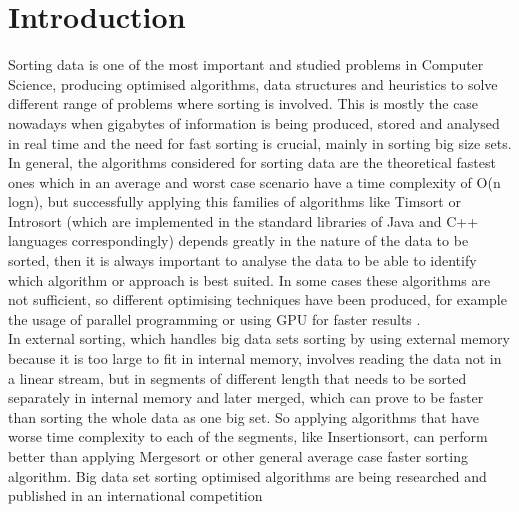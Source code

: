 \documentclass[a4paper,12pt]{article}
\begin{document}
\newpage
\tableofcontents
\newpage

\section{Introduction}

Sorting data is one of the most important and studied problems in Computer Science, producing optimised algorithms, data structures and heuristics to solve different range of problems where sorting is involved. This is mostly the case nowadays when gigabytes of information is being produced, stored and analysed in real time and the need for fast sorting is crucial, mainly in sorting big size sets. In general, the algorithms considered for sorting data are the theoretical fastest ones which in an average and worst case scenario have a time complexity of O(n logn), but successfully applying this families of algorithms like Timsort\cite{Timsort} or Introsort\cite{musser1997introspective} (which are implemented in the standard libraries of Java and C++ languages correspondingly) depends greatly in the nature of the data to be sorted, then it is always important to analyse the data to be able to identify which algorithm or approach is best suited. In some cases these algorithms are not sufficient, so different optimising techniques have been produced, for example the usage of parallel programming or using GPU for faster results \cite{satish2009designing}. \\ 

In external sorting, which handles big data sets sorting by using external memory because it is too large to fit in internal memory, involves reading the data not in a linear stream, but in segments of different length that needs to be sorted separately in internal memory and later merged, which can prove to be faster than sorting the whole data as one big set. So applying algorithms that have worse time complexity to each of the segments, like Insertionsort, can perform better than applying Mergesort or other general average case faster sorting algorithm. Big data set sorting optimised algorithms are being researched and published in an international competition \cite{SortBenchmark} \\
\\
\end{document}
